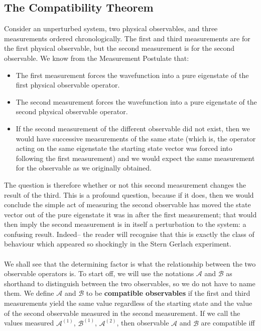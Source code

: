 \subsection{The Compatibility Theorem}
Consider an unperturbed system, two physical observables, and three measurements ordered chronologically. The first and third measurements are for the first physical observable, but the second measurement is for the second observable. We know from the Measurement Postulate that:
\begin{itemize}
    \item The first measurement forces the wavefunction into a pure eigenstate of the first physical observable operator. 
    \item The second measurement forces the wavefunction into a pure eigenstate of the second physical observable operator.
    \item If the second measurement of the different observable did not exist, then we would have successive measurements of the same state (which is, the operator acting on the same eigenstate the starting state vector was forced into following the first measurement) and we would expect the same measurement for the observable as we originally obtained.
\end{itemize}
The question is therefore whether or not this second measurement changes the result of the third. This is a profound question, because if it does, then we would conclude the simple act of measuring the second observable has moved the state vector out of the pure eigenstate it was in after the first measurement; that would then imply the second measurement is in itself a perturbation to the system: a confusing result. Indeed-- the reader will recognise that this is exactly the class of behaviour which appeared so shockingly in the Stern Gerlach experiment.
\\\\ 
We shall see that the determining factor is what the relationship between the two observable operators is. To start off, we will use the notations $\mathcal{A}$ and $\mathcal{B}$ as shorthand to distinguish between the two observables, so we do not have to name them. We define $\mathcal{A}$ and $\mathcal{B}$ to be \textbf{compatible observables} if the first and third measurements yield the same value regardless of the starting state and the value of the second observable measured in the second measurement. If we call the values measured $\mathcal{A}^{(1)}$, $\mathcal{B}^{(1)}$, $\mathcal{A}^{(2)}$, then observable $\mathcal{A}$ and $\mathcal{B}$ are compatible iff 

